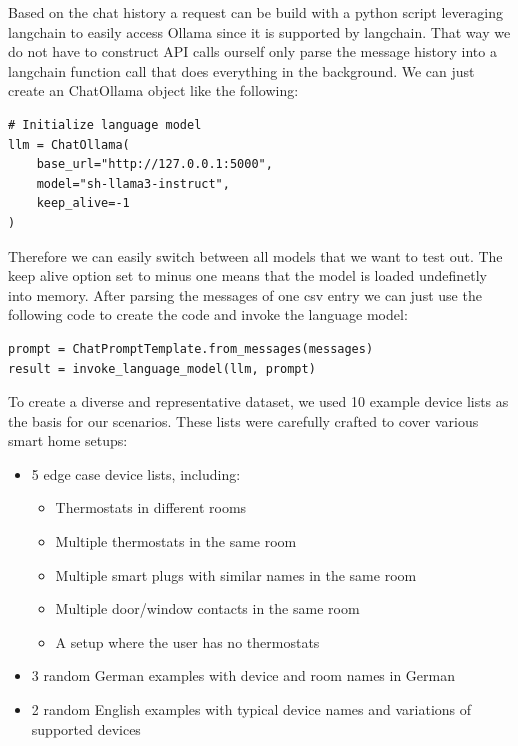 Based on the chat history a request can be build with a python script leveraging langchain to easily access Ollama since it is supported by langchain.
That way we do not have to construct API calls ourself only parse the message history into a langchain function call that does everything in the background.
We can just create an ChatOllama object like the following:

\begin{lstlisting}[numbers=none, frame=none]
# Initialize language model
llm = ChatOllama(
    base_url="http://127.0.0.1:5000",
    model="sh-llama3-instruct",
    keep_alive=-1
)
\end{lstlisting}

Therefore we can easily switch between all models that we want to test out. The keep alive option set to minus one means that the model is loaded undefinetly into memory.
After parsing the messages of one csv entry we can just use the following code to create the code and invoke the language model:

\begin{lstlisting}[numbers=none, frame=none]
prompt = ChatPromptTemplate.from_messages(messages)
result = invoke_language_model(llm, prompt)
\end{lstlisting}

To create a diverse and representative dataset, we used 10 example device lists as the basis for our scenarios. These lists were carefully crafted to cover various smart home setups:

\begin{itemize}
    \item 5 edge case device lists, including:
    \begin{itemize}
    \item Thermostats in different rooms
    \item Multiple thermostats in the same room
    \item Multiple smart plugs with similar names in the same room
    \item Multiple door/window contacts in the same room
    \item A setup where the user has no thermostats
    \end{itemize}
    \item 3 random German examples with device and room names in German
    \item 2 random English examples with typical device names and variations of supported devices
\end{itemize}

